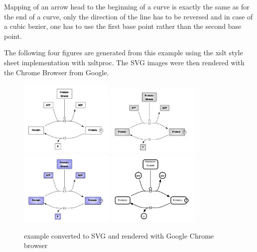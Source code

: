 Mapping of an arrow head to the beginning of a curve is exactly the same as for the end of a curve, only the
direction of the line has to be reversed and in case of a cubic bezier, one has to use the first base point rather than the second base point. 

The following four figures are generated from this example using the xslt style sheet implementation with xsltproc.
The SVG images were then rendered with the Chrome Browser from Google.

\begin{figure}[!ht]
\begin{center}
\includegraphics[width=0.4\textwidth]{figures/Phosphorylation_wireFrame}
\includegraphics[width=0.4\textwidth]{figures/Phosphorylation_gray}
\includegraphics[width=0.4\textwidth]{figures/Phosphorylation_color}
\includegraphics[width=0.4\textwidth]{figures/Phosphorylation_SBGN}
\end{center}
\caption{example converted to SVG and rendered with Google Chrome browser}
\label{ExampleRendering}
\end{figure}

